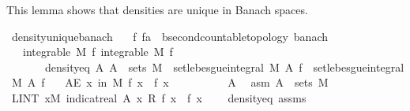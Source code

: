 \begin{isabellebody}
\begin{isamarkuptext}
This lemma shows that densities are unique in Banach spaces.%
\end{isamarkuptext}\isamarkuptrue%
\isamarkupfalse%
\ density{\isacharunderscore}{\kern0pt}unique{\isacharunderscore}{\kern0pt}banach{\isacharcolon}{\kern0pt}\isanewline
\ \ \ f\ f{\isacharprime}{\kern0pt}{\isacharcolon}{\kern0pt}{\isacharcolon}{\kern0pt}{\isachardoublequoteopen}{\isacharprime}{\kern0pt}a\ {\isasymRightarrow}\ {\isacharprime}{\kern0pt}b{\isacharcolon}{\kern0pt}{\isacharcolon}{\kern0pt}{\isacharbraceleft}{\kern0pt}second{\isacharunderscore}{\kern0pt}countable{\isacharunderscore}{\kern0pt}topology{\isacharcomma}{\kern0pt}\ banach{\isacharbraceright}{\kern0pt}{\isachardoublequoteclose}\isanewline
\ \ \ {\isachardoublequoteopen}integrable\ M\ f{\isachardoublequoteclose}\ {\isachardoublequoteopen}integrable\ M\ f{\isacharprime}{\kern0pt}{\isachardoublequoteclose}\isanewline
\ \ \ \ \ \ \ density{\isacharunderscore}{\kern0pt}eq{\isacharcolon}{\kern0pt}\ {\isachardoublequoteopen}{\isasymAnd}A{\isachardot}{\kern0pt}\ A\ {\isasymin}\ sets\ M\ {\isasymLongrightarrow}\ set{\isacharunderscore}{\kern0pt}lebesgue{\isacharunderscore}{\kern0pt}integral\ M\ A\ f\ {\isacharequal}{\kern0pt}\ set{\isacharunderscore}{\kern0pt}lebesgue{\isacharunderscore}{\kern0pt}integral\ M\ A\ f{\isacharprime}{\kern0pt}{\isachardoublequoteclose}\isanewline
\ \ \ {\isachardoublequoteopen}AE\ x\ in\ M{\isachardot}{\kern0pt}\ f\ x\ {\isacharequal}{\kern0pt}\ f{\isacharprime}{\kern0pt}\ x{\isachardoublequoteclose}\isanewline
%
\isadelimproof
%
\endisadelimproof
%
\isatagproof
{}\isamarkupfalse%
{\isacharminus}{\kern0pt}\isanewline
\ \ \isacommand{{\isacharbraceleft}{\kern0pt}}\isamarkupfalse%
\ \isanewline
\ \ \ \ \isamarkupfalse%
\ A\ \isamarkupfalse%
\ asm{\isacharcolon}{\kern0pt}\ {\isachardoublequoteopen}A\ {\isasymin}\ sets\ M{\isachardoublequoteclose}\isanewline
\ \ \ \ \isamarkupfalse%
\ {\isachardoublequoteopen}LINT\ x{\isacharbar}{\kern0pt}M{\isachardot}{\kern0pt}\ indicat{\isacharunderscore}{\kern0pt}real\ A\ x\ {\isacharasterisk}{\kern0pt}\isactrlsub R\ {\isacharparenleft}{\kern0pt}f\ x\ {\isacharminus}{\kern0pt}\ f{\isacharprime}{\kern0pt}\ x{\isacharparenright}{\kern0pt}\ {\isacharequal}{\kern0pt}\ {}{\isachardoublequoteclose}\ \isamarkupfalse%
\ density{\isacharunderscore}{\kern0pt}eq\ assms{\isacharparenleft}{\kern0pt}{}{\isacharcomma}{\kern0pt}{}{\isacharparenright}{\kern0pt}\ \isamarkupfalse%

\end{isabellebody}
